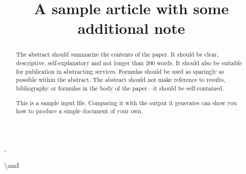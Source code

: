 \documentclass[aoas]{imsart}
\numberwithin{equation}{section}
\theoremstyle{plain}
\theoremstyle{remark}
\begin{document}
\begin{frontmatter}
\title{A sample article with some additional note}


\begin{aug}


\author[A]{ 
  }
  ,
\author[B]{ 
  }
  \textbackslash and
\author[B]{ 
  }
  

\address[A]{Department, University or Company Name,
  }
\address[B]{Department, University or Company Name,
  }
\end{aug}

\begin{abstract}
The abstract should summarize the contents of the paper. It should be
clear, descriptive, self-explanatory and not longer than 200 words. It
should also be suitable for publication in abstracting services.
Formulas should be used as sparingly as possible within the abstract.
The abstract should not make reference to results, bibliography or
formulas in the body of the paper---it should be self-contained.

This is a sample input file. Comparing it with the output it generates
can show you how to produce a simple document of your own.
\end{abstract}


\begin{keyword}
\end{keyword}

\end{frontmatter}
\end{document}
